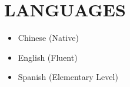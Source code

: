 \documentclass[letterpaper,11pt]{article}
\newcommand{\resumeSubHeadingListStart}{\begin{itemize}[leftmargin=0.0in, label={}]}
\newcommand{\resumeSubHeadingListEnd}{\end{itemize}}
\begin{document}
	\section{LANGUAGES}
	\begin{multicols}{3}
		\begin{itemize}[itemsep=-2pt, parsep=5pt]
			\item\small Chinese (Native)
			\item       English (Fluent)
			\item       Spanish (Elementary Level)
		\end{itemize}
	\end{multicols}
	\vspace*{2.0\multicolsep}
	\vspace{7pt}
	
\end{document}
